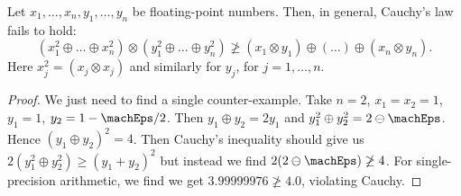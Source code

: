 \begin{prop}\label{prop:float:identities:failure-of-cauchy-schwarz}
Let $x_{1},\dots,x_{n},y_{1},\dots,y_{n}$ be floating-point
numbers. Then, in general, Cauchy's law fails to hold:
\begin{equation}
  (x_{1}^{2}\oplus\dots\oplus x_{n}^{2})\otimes(y_{1}^{2}\oplus\dots\oplus y_{n}^{2})\not\geq
  (x_{1}\otimes y_{1})\oplus(\dots)\oplus(x_{n}\otimes y_{n}).
\end{equation}
Here $x_{j}^{2}=(x_{j}\otimes x_{j})$ and similarly for $y_{j}$, for $j=1,\dots,n$.
\end{prop}
\begin{proof}
  We just need to find a single counter-example.
  Take $n=2$, $x_{1}=x_{2}=1$, $y_{1}=1$, $y_{2} = 1 - \machEps/2$. Then
  $y_{1}\oplus y_{2}=2y_{1}$
  and $y_{1}^{2}\oplus y_{2}^{2} = 2\ominus\machEps$.
  Hence $(y_{1} \oplus y_{2})^{2} = 4$. Then Cauchy's inequality should
  give us $2(y_{1}^{2}\oplus y_{2}^{2})\geq(y_{1} + y_{2})^{2}$ but
  instead we find $2(2\ominus\machEps)\not\geq 4$. For single-precision
  arithmetic, we find we get $3.99999976\not\geq 4.0$, violating Cauchy.
\end{proof}


